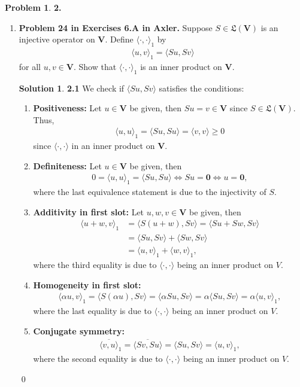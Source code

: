 \documentclass{article}
\theoremstyle{definition}
\newtheorem*{prob*}{Problem}
\newtheorem*{sln*}{Solution}
\newcommand{\V}{\mathbf{V}}
\newcommand{\LL}{\mathfrak{L}}
\newcommand{\la}{\langle}
\newcommand{\ra}{\rangle}
\begin{document}
\begin{prob*}\textbf{2.} 
	\begin{enumerate}
		\item \textbf{Problem 24 in Exercises 6.A in Axler.} Suppose $S \in \LL(\V)$ is an injective operator on $\V$. Define $\la \cdot , \cdot \ra_1$ by 
		\begin{align*}
		\la u , v\ra_1 = \la Su, Sv \ra
		\end{align*}  
		for all $u,v\in \V$. Show that $\la \cdot , \cdot \ra_1$ is an inner product on $\V$. 
		
		
		
		\begin{sln*}\textbf{2.1} 
			We check if $\la Su, Sv \ra$ satisfies the conditions:
			\begin{enumerate}
				\item \textbf{Positiveness: }Let $u \in \V$ be given, then $Su = v \in \V$ since $S \in \LL(\V)$. Thus,
				\begin{align*}
				\la u,u \ra_1 = \la Su ,Su \ra = \la v,v \ra \geq 0
				\end{align*}
				since $\la \cdot, \cdot \ra$ in an inner product on $\V$.
				
				\item \textbf{Definiteness: }Let $u\in \V$ be given, then
				\begin{align*}
				0 = \la u,u \ra_1 = \la Su ,Su \ra \iff Su = \mathbf{0} \iff u = \mathbf{0},
				\end{align*}
				where the last equivalence statement is due to the injectivity of $S$. 
				
				\item \textbf{Additivity in first slot: }Let $u,w,v \in \V$ be given, then 
				\begin{align*}
				\la u+w ,v \ra_1 &= \la S(u+w), Sv \ra = \la Su + Sw , Sv \ra \\
				&= \la Su, Sv \ra + \la Sw, Sv \ra \\
				&= \la u,v \ra_1 + \la w,v \ra_1,
				\end{align*}
				where the third equality is due to $\la \cdot, \cdot \ra$ being an inner product on $V$.
				\item \textbf{Homogeneity in first slot: }
				\begin{align*}
				\la \alpha u,v \ra_1 = \la S(\alpha u), Sv \ra = \la \alpha Su, Sv \ra = \alpha \la Su, Sv\ra = \alpha\la u,v\ra_1,
				\end{align*}
				where the last equality is due to $\la \cdot, \cdot \ra$ being an inner product on $V$.
				\item \textbf{Conjugate symmetry: }
				\begin{align*}
				\overline{\la v,u \ra}_1 = \overline{\la Sv, Su \ra} = \la Su, Sv \ra = \la u ,v\ra_1, 
				\end{align*}
				where the second equality is due to $\la \cdot, \cdot \ra$ being an inner product on $V$.
			\end{enumerate}\qed
		\end{sln*}
		

\end{enumerate}
\end{prob*}
\end{document}
